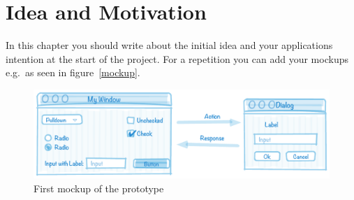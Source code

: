 \documentclass{scrreprt}
\begin{document}
\chapter{Idea and Motivation}
In this chapter you should write about the initial idea and your applications intention at the start of the project.
For a repetition you can add your mockups e.g.\ as seen in figure~\vref{mockup}.
\begin{figure}
    \centering
    \includegraphics[width=14.6cm]{includes/mockup}
    \caption{First mockup of the prototype}
    \label{mockup}
\end{figure}
\end{document}
